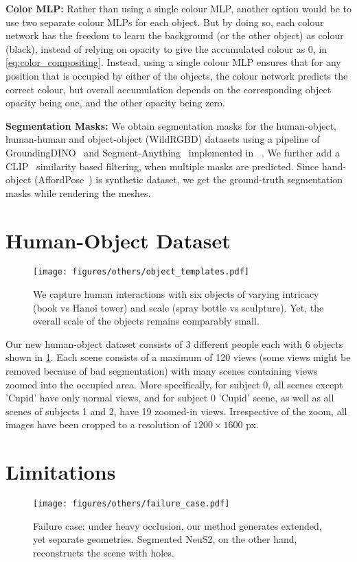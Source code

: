 \par \noindent \textbf{Color MLP:} Rather than using a single colour MLP, another option would be to use two separate colour MLPs for each object. But by doing so, each colour network has the freedom to learn the background (or the other object) as colour (black), instead of relying on opacity to give the accumulated colour as 0, in \cref{eq:color_compositing}. Instead, using a single colour MLP ensures that for any position that is occupied by either of the objects, the colour network predicts the correct colour, but overall accumulation depends on the corresponding object opacity being one, and the other opacity being zero.
\par \noindent
\textbf{Segmentation Masks:} We obtain segmentation masks for the human-object, human-human and object-object (WildRGBD) datasets using a pipeline of GroundingDINO~\cite{liu2023grounding} and Segment-Anything~\cite{kirillov2023segany} implemented in ~\cite{langsam}. We further add a CLIP~\cite{CLIP} similarity based filtering, when multiple masks are predicted. Since hand-object (AffordPose~\cite{affordpose}) is synthetic dataset, we get the ground-truth segmentation masks while rendering the meshes.
\section{Human-Object Dataset}
\label{sec:human_object_dataset}
\begin{figure}
    \centering
    \texttt{[image: figures/others/object\_templates.pdf]}
    \caption{We capture human interactions with six objects of varying intricacy (book vs Hanoi tower) and scale (spray bottle vs sculpture). Yet, the overall scale of the objects remains comparably small. 
    }
    \label{fig:scanned_templates}
\end{figure}

Our new human-object dataset consists of 3 different people each with 6 objects shown in \cref{fig:scanned_templates}. Each scene consists of a maximum of 120 views (some views might be removed because of bad segmentation) with many scenes containing views zoomed into the occupied area. More specifically, for subject 0, all scenes except 'Cupid' have only normal views, and for subject 0 'Cupid' scene, as well as all scenes of subjects 1 and 2, have 19 zoomed-in views. Irrespective of the zoom, all images have been cropped to a resolution of $1200\times1600$ px. 
\section{Limitations}
\begin{figure}[!h]
    \centering
    \texttt{[image: figures/others/failure\_case.pdf]}
    \caption{Failure case: under heavy occlusion, our method generates extended, yet separate geometries. Segmented NeuS2, on the other hand, reconstructs the scene with holes.}
    \label{fig:failure_case}
\end{figure}


